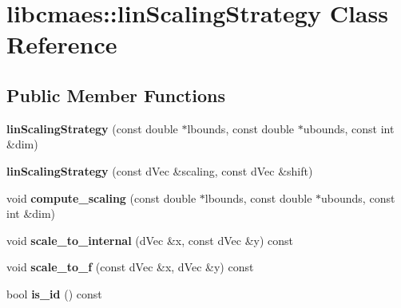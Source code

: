 \hypertarget{classlibcmaes_1_1linScalingStrategy}{\section{libcmaes\-:\-:lin\-Scaling\-Strategy Class Reference}
\label{classlibcmaes_1_1linScalingStrategy}
}
\subsection*{Public Member Functions}
\begin{DoxyCompactItemize}
\item 
\hypertarget{classlibcmaes_1_1linScalingStrategy_a02a64849f458cf8a440501d9e041b3e9}{{\bfseries lin\-Scaling\-Strategy} (const double $\ast$lbounds, const double $\ast$ubounds, const int \&dim)}\label{classlibcmaes_1_1linScalingStrategy_a02a64849f458cf8a440501d9e041b3e9}

\item 
\hypertarget{classlibcmaes_1_1linScalingStrategy_af798cb677f9f0ede111252c1ee05ab08}{{\bfseries lin\-Scaling\-Strategy} (const d\-Vec \&scaling, const d\-Vec \&shift)}\label{classlibcmaes_1_1linScalingStrategy_af798cb677f9f0ede111252c1ee05ab08}

\item 
\hypertarget{classlibcmaes_1_1linScalingStrategy_a043e908a7f3a7864c6a21ff5f041c48d}{void {\bfseries compute\-\_\-scaling} (const double $\ast$lbounds, const double $\ast$ubounds, const int \&dim)}\label{classlibcmaes_1_1linScalingStrategy_a043e908a7f3a7864c6a21ff5f041c48d}

\item 
\hypertarget{classlibcmaes_1_1linScalingStrategy_a6b111ef2e0f78c0f6a2cde92df7aa90e}{void {\bfseries scale\-\_\-to\-\_\-internal} (d\-Vec \&x, const d\-Vec \&y) const }\label{classlibcmaes_1_1linScalingStrategy_a6b111ef2e0f78c0f6a2cde92df7aa90e}

\item 
\hypertarget{classlibcmaes_1_1linScalingStrategy_a9ea06cf4d10c3015a154c763f88b862b}{void {\bfseries scale\-\_\-to\-\_\-f} (const d\-Vec \&x, d\-Vec \&y) const }\label{classlibcmaes_1_1linScalingStrategy_a9ea06cf4d10c3015a154c763f88b862b}

\item 
\hypertarget{classlibcmaes_1_1linScalingStrategy_a6a806b86273ed2ef3c4412ffc5d53662}{bool {\bfseries is\-\_\-id} () const }\label{classlibcmaes_1_1linScalingStrategy_a6a806b86273ed2ef3c4412ffc5d53662}

\end{DoxyCompactItemize}
